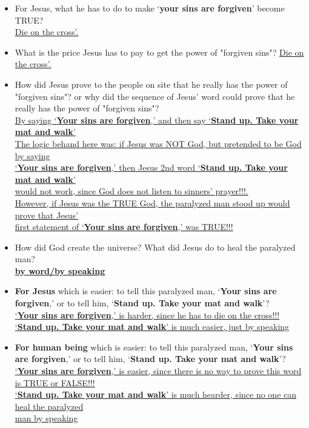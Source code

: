 \begin{itemize}[noitemsep]
\item For Jesus, what he has to do to make ‘\textbf{your sins are forgiven}’ become TRUE?\\
\underline{Die on the cross'.}\\

\item What is the price Jesus has to pay to get the power of "forgiven sins"?
\underline{Die on the cross'.}\\


\item How did Jesus prove to the people on site that he really has the power of  "forgiven sins"? or why did the sequence of Jesus' word could prove that he really has the power of  "forgiven sins"?\\
\underline{By saying ‘\textbf{Your sins are forgiven},’ and then say  ‘\textbf{Stand up. Take your mat and walk}’} \\
\underline{The logic behand here was: if Jesus was NOT God, but pretended to be God by saying}\\
\underline{‘\textbf{Your sins are forgiven},’ then Jesus 2nd word ‘\textbf{Stand up. Take your mat and walk}’ }\\
\underline{would not work, since God does not listen to sinners' prayer!!!. }\\
\underline{However, if Jesus was the TRUE God, the paralyzed man stood up would prove that Jesus' }\\
\underline{first statement of ‘\textbf{Your sins are forgiven},’ was TRUE!!!}\\


\item How did God create the universe? What did Jesus do to heal the paralyzed man?\\
\textbf{\underline{by word/by speaking}}\\

\item \textbf{For Jesus} which is easier: to tell this paralyzed man, ‘\textbf{Your sins are forgiven},’ or to tell him, ‘\textbf{Stand up. Take your mat and walk}’?\\
\underline{‘\textbf{Your sins are forgiven},’ is harder, since he has to die on the cross!!!}\\
\underline{‘\textbf{Stand up. Take your mat and walk}’ is much easier, just by speaking}\\


\item \textbf{For human being} which is easier: to tell this paralyzed man, ‘\textbf{Your sins are forgiven},’ or to tell him, ‘\textbf{Stand up. Take your mat and walk}’?\\
\underline{‘\textbf{Your sins are forgiven},’ is easier, since there is no way to prove this word is TRUE or FALSE!!!}\\
\underline{‘\textbf{Stand up. Take your mat and walk}’ is much hearder, since no one can heal the paralyzed}\\
\underline{man by speaking}\\


\end{itemize}

